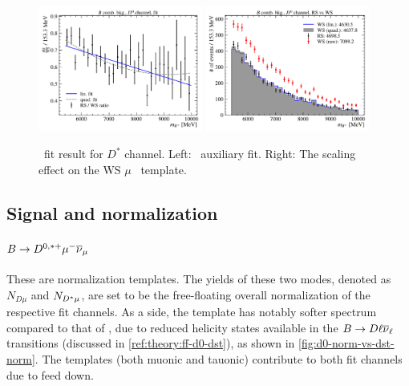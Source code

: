 \begin{figure}[htb]
    \centering
    \includegraphics[width=0.48\textwidth]{figs-fit-fit-templates/data-driven-plots/b_comb/fit_b_comb_d0_fit.pdf}
    \includegraphics[width=0.48\textwidth]{figs-fit-fit-templates/data-driven-plots/b_comb/fit_b_comb_d0_scaled.pdf}

    \caption{
        \BComb\ fit result for $D^*$ channel.
        Left: \BComb\ auxiliary fit.
        Right: The scaling effect on the WS $\mu$ \BComb\ template.
    }
    \label{fig:b-comb-d0}
\end{figure}


\subsection{Signal and normalization}
\label{tmpl:sig-norm}

\paragraph{$B \rightarrow D^{0,*+}{\mu^-}{{\overline{\nu}}_\mu}$}
These are normalization templates.
The yields of these two modes, denoted as $N_{D\mu}$ and $N_{{{D}^*}\mu}$,
are set to be the free-floating overall normalization of the respective
fit channels.
As a side, the \Dz\muon template has notably softer \qSq spectrum compared to
that of \Dstar\muon, due to reduced helicity states available in the
$B \rightarrow D \ell {\ensuremath{{\overline{\nu}}_\ell}}$ transitions
(discussed in \cref{ref:theory:ff-d0-dst}),
as shown in \cref{fig:d0-norm-vs-dst-norm}.
The \Dstarp templates (both muonic and tauonic) contribute to both fit channels
due to feed down.


